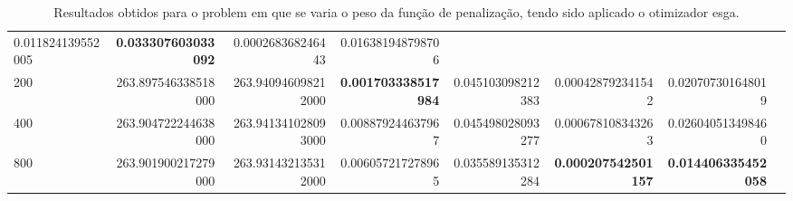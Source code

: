 \begin{table}[!ht]
{\begin{tabular}{lrrrrrrr}
            0.011824139552005                              &
            \textbf{0.033307603033092}                     &
            0.000268368246443                              &
            0.016381948798706
            \\
            200                                            &
            263.897546338518000                            &
            263.940946098212000                            &
            \textbf{0.001703338517984}                     &
            0.045103098212383                              &
            0.000428792341542                              &
            0.020707301648019
            \\
            400                                            &
            263.904722244638000                            &
            263.941341028093000                            &
            0.008879244637967                              &
            0.045498028093277                              &
            0.000678108343263                              &
            0.026040513498460
            \\
            800                                            &
            263.901900217279000                            &
            263.931432135312000                            &
            0.006057217278965                              &
            0.035589135312284                              &
            \textbf{0.000207542501157}                     &
            \textbf{0.014406335452058}
            \\ \toprule
        \end{tabular}%
    }
    \caption{Resultados obtidos para o \gls{problem} em que se varia o peso da função de penalização, tendo sido aplicado o otimizador \gls{esga}.
    }%
    \label{tab:resultados-genetico}
\end{table}